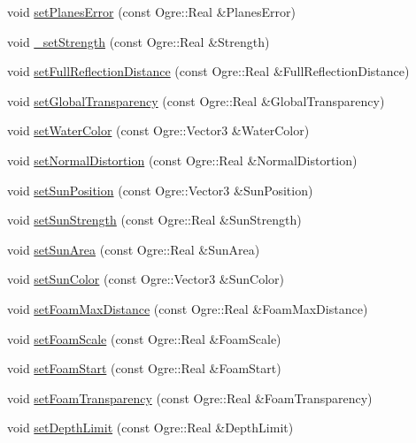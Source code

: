 \begin{CompactItemize}
\item 
void \hyperlink{class_hydrax_1_1_hydrax_336c1b2587e8e26c123af6c5bdbc2400}{setPlanesError} (const Ogre::Real \&PlanesError)
\item 
void \hyperlink{class_hydrax_1_1_hydrax_a1c3ac9b604a3116fbd5b4d55429811d}{\_\-setStrength} (const Ogre::Real \&Strength)
\item 
void \hyperlink{class_hydrax_1_1_hydrax_e4a765e38a2d81a180b9e74a002e8010}{setFullReflectionDistance} (const Ogre::Real \&FullReflectionDistance)
\item 
void \hyperlink{class_hydrax_1_1_hydrax_b601c8008ca2bc47e66d9a5e4e4b63a7}{setGlobalTransparency} (const Ogre::Real \&GlobalTransparency)
\item 
void \hyperlink{class_hydrax_1_1_hydrax_e931996f1e97b983a4e3ea57a30a8d47}{setWaterColor} (const Ogre::Vector3 \&WaterColor)
\item 
void \hyperlink{class_hydrax_1_1_hydrax_b745c19968fdc47b71d65bb88679d447}{setNormalDistortion} (const Ogre::Real \&NormalDistortion)
\item 
void \hyperlink{class_hydrax_1_1_hydrax_86467f51a5b69343a97ff6536c922929}{setSunPosition} (const Ogre::Vector3 \&SunPosition)
\item 
void \hyperlink{class_hydrax_1_1_hydrax_ad0a9050fe394da479b1e0431d99a151}{setSunStrength} (const Ogre::Real \&SunStrength)
\item 
void \hyperlink{class_hydrax_1_1_hydrax_276bb2f6256badf7c3a72fd758732e00}{setSunArea} (const Ogre::Real \&SunArea)
\item 
void \hyperlink{class_hydrax_1_1_hydrax_dc74459b43cd00a19b60b8391531cb17}{setSunColor} (const Ogre::Vector3 \&SunColor)
\item 
void \hyperlink{class_hydrax_1_1_hydrax_7a741e312c15cc17958dd09e39b7f4fe}{setFoamMaxDistance} (const Ogre::Real \&FoamMaxDistance)
\item 
void \hyperlink{class_hydrax_1_1_hydrax_9332262daefd2ba3ee72f8e07b642b98}{setFoamScale} (const Ogre::Real \&FoamScale)
\item 
void \hyperlink{class_hydrax_1_1_hydrax_5eaf61497bb4e306a64ab6828acf95e5}{setFoamStart} (const Ogre::Real \&FoamStart)
\item 
void \hyperlink{class_hydrax_1_1_hydrax_031be3ce2201a6087ecb6185309acc4e}{setFoamTransparency} (const Ogre::Real \&FoamTransparency)
\item 
void \hyperlink{class_hydrax_1_1_hydrax_83f64aa230e64e83d9732290b50f3787}{setDepthLimit} (const Ogre::Real \&DepthLimit)
\item 

\end{CompactItemize}
